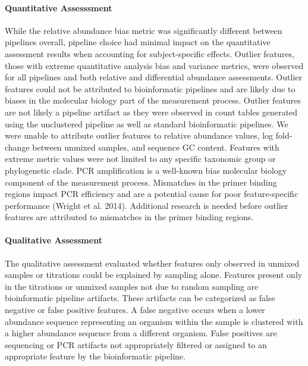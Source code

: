 \documentclass[smallextended]{svjour3}       %
\begin{document}
\hypertarget{quantitative-assesssment}{%
\paragraph{Quantitative Assesssment}\label{quantitative-assesssment}}

While the relative abundance bias metric was significantly different
between pipelines overall, pipeline choice had minimal impact on the
quantitative assessment results when accounting for subject-specific
effects. Outlier features, those with extreme quantitative analysis bias
and variance metrics, were observed for all pipelines and both relative
and differential abundance assessments. Outlier features could not be
attributed to bioinformatic pipelines and are likely due to biases in
the molecular biology part of the measurement process. Outlier features
are not likely a pipeline artifact as they were observed in count tables
generated using the unclustered pipeline as well as standard
bioinformatic pipelines. We were unable to attribute outlier features to
relative abundance values, log fold-change between unmixed samples, and
sequence GC content. Features with extreme metric values were not
limited to any specific taxonomic group or phylogenetic clade. PCR
amplification is a well-known bias molecular biology component of the
measurement process. Mismatches in the primer binding regions impact PCR
efficiency and are a potential cause for poor feature-specific
performance (Wright et al. 2014). Additional research is needed before
outlier features are attributed to mismatches in the primer binding
regions.

\hypertarget{qualitative-assessment-2}{%
\paragraph{Qualitative Assessment}\label{qualitative-assessment-2}}

The qualitative assessment evaluated whether features only observed in
unmixed samples or titrations could be explained by sampling alone.
Features present only in the titrations or unmixed samples not due to
random sampling are bioinformatic pipeline artifacts. These artifacts
can be categorized as false negative or false positive features. A false
negative occurs when a lower abundance sequence representing an organism
within the sample is clustered with a higher abundance sequence from a
different organism. False positives are sequencing or PCR artifacts not
appropriately filtered or assigned to an appropriate feature by the
bioinformatic pipeline.
\end{document}
